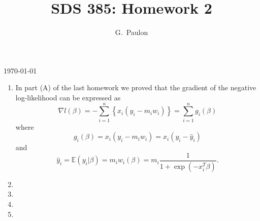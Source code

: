 \documentclass{homework}
\title{SDS 385: Homework 2}
\author{G.~Paulon}
\begin{document}
\makeatletter
\begin{titlepage}
	\vspace*{\fill}
	\centering
	{\huge \@title \par}
	\vskip0.5cm
	{\large \@author \par}
	\vskip0.5cm
	{\large \today \par}
	\vspace*{\fill}
\end{titlepage}
\makeatother

\newpage 
\mbox{}
\thispagestyle{empty}
\newpage

\setcounter{page}{1}


\begin{enumerate}[label=(\Alph*)]

\item In part (A) of the last homework we proved that the gradient of the negative log-likelihood can be expressed as
\begin{equation*}
\nabla l(\beta) = - \sum_{i=1}^n \left\lbrace x_i (y_i - m_i w_i) \right\rbrace = \sum_{i=1}^n g_i (\beta)
\end{equation*}
where
\begin{equation*}
g_i (\beta) = x_i (y_i - m_i w_i) = x_i (y_i - \hat{y}_i)
\end{equation*}
and
\begin{equation*}
\hat{y}_i = \mathbb{E} (y_i | \beta) = m_i w_i (\beta) = m_i \frac{1}{1+\exp(-x_i^T \beta)}.
\end{equation*}

\item

\item

\item

\item

\end{enumerate}
\end{document}
